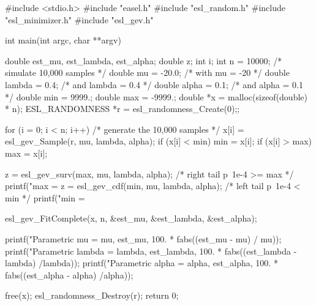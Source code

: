 \begin{cchunk}
#include <stdio.h>
#include "easel.h"
#include "esl_random.h"
#include "esl_minimizer.h"
#include "esl_gev.h"

int
main(int argc, char **argv)
{
  double  est_mu, est_lambda, est_alpha;
  double  z;
  int     i;
  int     n         = 10000; 	   /* simulate 10,000 samples */
  double  mu        = -20.0;       /* with mu = -20    */ 
  double  lambda    = 0.4;         /* and lambda = 0.4 */
  double  alpha     = 0.1;	   /* and alpha = 0.1  */
  double  min       =  9999.;
  double  max       = -9999.;
  double *x         = malloc(sizeof(double) * n);
  ESL_RANDOMNESS *r = esl_randomness_Create(0);;

  for (i = 0; i < n; i++)	/* generate the 10,000 samples */
    { 
      x[i] = esl_gev_Sample(r, mu, lambda, alpha);
      if (x[i] < min) min = x[i];
      if (x[i] > max) max = x[i];
    }

  z = esl_gev_surv(max, mu, lambda, alpha);       /* right tail p~1e-4 >= max */
  printf("max = %
  z = esl_gev_cdf(min, mu, lambda, alpha);        /* left tail p~1e-4 < min */
  printf("min = %

  esl_gev_FitComplete(x, n, &est_mu, &est_lambda, &est_alpha);
 
  printf("Parametric mu     = %
	 mu,     est_mu,     100. * fabs((est_mu - mu) / mu));
  printf("Parametric lambda = %
	 lambda, est_lambda, 100. * fabs((est_lambda - lambda) /lambda));
  printf("Parametric alpha  = %
	 alpha,  est_alpha,  100. * fabs((est_alpha - alpha) /alpha));

  free(x);
  esl_randomness_Destroy(r);
  return 0;
}
\end{cchunk}
